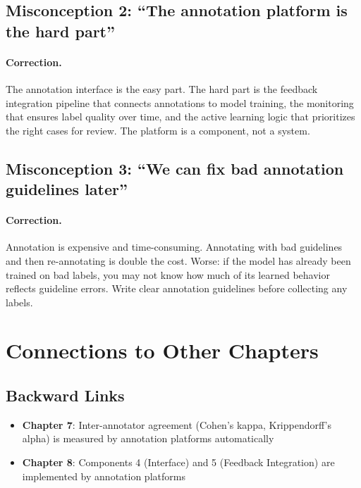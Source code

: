 \subsection{Misconception 2: ``The annotation platform is the hard part''}

\paragraph{Correction.}
The annotation interface is the easy part. The hard part is the feedback integration pipeline that connects annotations to model training, the monitoring that ensures label quality over time, and the active learning logic that prioritizes the right cases for review. The platform is a component, not a system.

\subsection{Misconception 3: ``We can fix bad annotation guidelines later''}

\paragraph{Correction.}
Annotation is expensive and time-consuming. Annotating with bad guidelines and then re-annotating is double the cost. Worse: if the model has already been trained on bad labels, you may not know how much of its learned behavior reflects guideline errors. Write clear annotation guidelines before collecting any labels.

\section{Connections to Other Chapters}

\subsection{Backward Links}
\begin{itemize}
    \item \textbf{Chapter 7}: Inter-annotator agreement (Cohen's kappa, Krippendorff's alpha) is measured by annotation platforms automatically
    \item \textbf{Chapter 8}: Components 4 (Interface) and 5 (Feedback Integration) are implemented by annotation platforms
\end{itemize}

